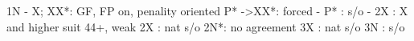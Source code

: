 1N - X;
XX*: GF, FP on, penality oriented
P* ->XX*: forced
        - P* : s/o
        - 2X : X and higher suit 44+, weak
2X : nat s/o
2N*: no agreement
3X : nat s/o
3N : s/o